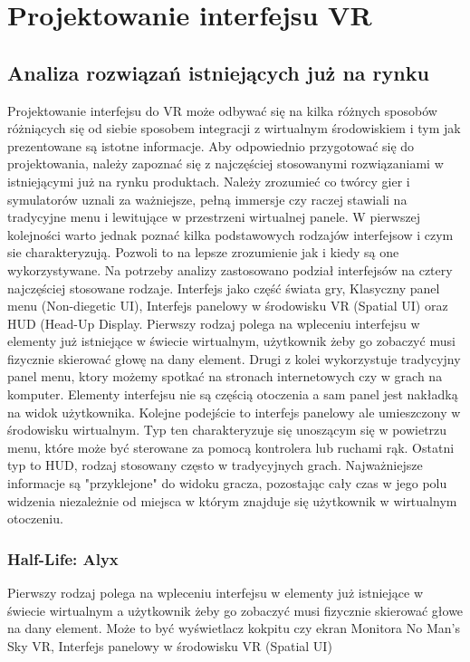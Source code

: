 \chapter{Projektowanie interfejsu VR}


\section{Analiza rozwiązań istniejących już na rynku}
Projektowanie interfejsu do VR może odbywać się na kilka różnych sposobów różniących się od siebie sposobem integracji z wirtualnym środowiskiem i tym jak prezentowane są istotne informacje. Aby odpowiednio przygotować się do projektowania, należy zapoznać się z najczęściej stosowanymi rozwiązaniami w istniejącymi już na rynku produktach. Należy zrozumieć co twórcy gier i symulatorów uznali za ważniejsze, pełną immersje czy raczej stawiali na tradycyjne menu i lewitujące w przestrzeni wirtualnej panele. W pierwszej kolejności warto jednak poznać kilka podstawowych rodzajów interfejsow i czym sie charakteryzują. Pozwoli to na lepsze zrozumienie jak i kiedy są one wykorzystywane. Na potrzeby analizy zastosowano podział interfejsów na cztery najczęściej stosowane rodzaje. Interfejs jako część świata gry, Klasyczny panel menu (Non-diegetic UI), Interfejs panelowy w środowisku VR (Spatial UI) oraz HUD (Head-Up Display.
Pierwszy rodzaj polega na wpleceniu interfejsu w elementy już istniejące w świecie wirtualnym, użytkownik żeby go zobaczyć musi fizycznie skierować głowę na dany element. Drugi z kolei wykorzystuje tradycyjny panel menu, ktory możemy spotkać na stronach internetowych czy w grach na komputer. Elementy interfejsu nie są częścią otoczenia a sam panel jest nakładką na widok użytkownika. Kolejne podejście to interfejs panelowy ale umieszczony w środowisku wirtualnym. Typ ten charakteryzuje się unoszącym się w powietrzu menu, które może być sterowane za pomocą kontrolera lub ruchami rąk. Ostatni typ to HUD, rodzaj stosowany często w tradycyjnych grach. Najważniejsze informacje są "przyklejone" do widoku gracza, pozostając cały czas w jego polu widzenia niezależnie od miejsca w którym znajduje się użytkownik w wirtualnym otoczeniu.

\subsection{Half-Life: Alyx}

Pierwszy rodzaj polega na wpleceniu interfejsu w elementy już istniejące w świecie wirtualnym a użytkownik żeby go zobaczyć musi fizycznie skierować głowe na dany element. Może to być wyświetlacz kokpitu  czy ekran Monitora
No Man’s Sky VR, Interfejs panelowy w środowisku VR (Spatial UI)


